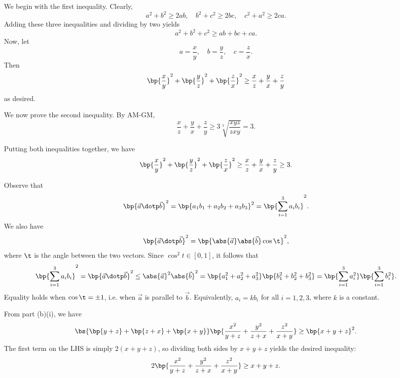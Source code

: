 \begin{solution}
    \begin{ppart}
        We begin with the first inequality. Clearly, \[a^2 + b^2 \geq 2ab, \quad b^2 + c^2 \geq 2bc, \quad c^2 + a^2 \geq 2ca.\] Adding these three inequalities and dividing by two yields \[a^2 + b^2 + c^2 \geq ab + bc + ca.\] Now, let \[a = \frac{x}{y}, \quad b = \frac{y}{z}, \quad c = \frac{z}{x}.\] Then \[\bp{\frac{x}{y}}^2 + \bp{\frac{y}{z}}^2 + \bp{\frac{z}{x}}^2 \geq \frac{x}{z} + \frac{y}{x} + \frac{z}{y}\] as desired.

        We now prove the second inequality. By AM-GM, \[\frac{x}{z} + \frac{y}{x} + \frac{z}{y} \geq 3\sqrt[3]{\frac{xyz}{zxy}} = 3.\]

        Putting both inequalities together, we have \[\bp{\frac{x}{y}}^2 + \bp{\frac{y}{z}}^2 + \bp{\frac{z}{x}}^2 \geq \frac{x}{z} + \frac{y}{x} + \frac{z}{y} \geq 3.\]
    \end{ppart}
    \begin{ppart}
        \begin{psubpart}
            Observe that \[\bp{\vec a \dotp \vec b}^2 = \bp{a_1 b_1 + a_2 b_2 + a_3 b_3}^2 = \bp{\sum_{i = 1}^3 a_i b_i}^2.\] We also have \[\bp{\vec a \dotp \vec b}^2 = \bp{\abs{\vec a} \abs{\vec b} \cos \t}^2,\] where $\t$ is the angle between the two vectors. Since $\cos^2 t \in [0, 1]$, it follows that \[\bp{\sum_{i = 1}^3 a_i b_i}^2 = \bp{\vec a \dotp \vec b}^2 \leq \abs{\vec a}^2 \abs{\vec b}^2 = \bp{a_1^2 + a_2^2 + a_3^2} \bp{b_1^2 + b_2^2 + b_3^2} = \bp{\sum_{i = 1}^3 a_i^2} \bp{\sum_{i = 1}^3 b_i^2}.\] Equality holds when $\cos \t = \pm 1$, i.e. when $\vec a$ is parallel to $\vec b$. Equivalently, $a_i = k b_i$ for all $i = 1, 2, 3$, where $k$ is a constant.
        \end{psubpart}
        \begin{psubpart}
            From part (b)(i), we have \[\bs{\bp{y + z} + \bp{z + x} + \bp{x + y}} \bp{\frac{x^2}{y+z} + \frac{y^2}{z + x} + \frac{z^2}{x + y}} \geq \bp{x + y + z}^2.\] The first term on the LHS is simply $2(x + y + z)$, so dividing both sides by $x + y + z$ yields the desired inequality: \[2\bp{\frac{x^2}{y+z} + \frac{y^2}{z + x} + \frac{z^2}{x + y}} \geq x + y + z.\]
        \end{psubpart}
    \end{ppart}
\end{solution}

